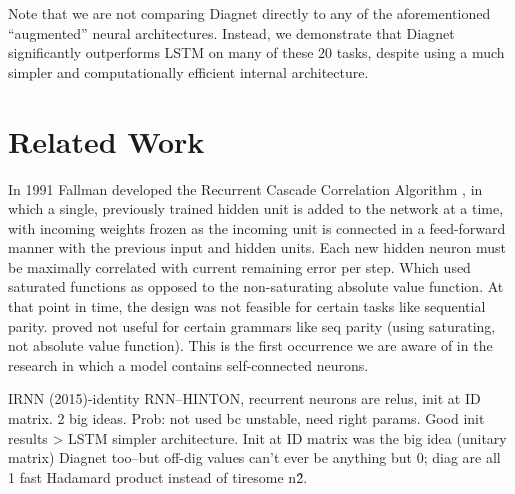 \documentclass{article}
\begin{document}
Note that we are not comparing Diagnet directly to any of the aforementioned “augmented” neural architectures. Instead, we demonstrate that Diagnet significantly outperforms LSTM on many of these 20 tasks, despite using a much simpler and computationally efficient internal architecture.

\section{Related Work}
\label{gen_inst}





In 1991 Fallman developed the Recurrent Cascade Correlation Algorithm \citet{Fahlman1990TheRC}, in which a single, previously trained hidden unit is added to the network at a time, with incoming weights frozen as the incoming unit is connected in a feed-forward manner with the previous input and hidden units. Each new hidden neuron must be maximally correlated with current remaining error per step.  
Which used saturated functions as opposed to the non-saturating absolute value function.  At that point in time, the design was not feasible for certain tasks like sequential parity.  proved not useful for certain grammars like seq parity (using saturating, not absolute value function). This is the first occurrence we are aware of in the research in which a model contains self-connected neurons.

IRNN (2015)-identity RNN--HINTON, recurrent neurons are relus, init at ID matrix. 2 big ideas. Prob: not used bc unstable, need right params.  Good init results > LSTM simpler architecture. Init at ID matrix was the big idea (unitary matrix) Diagnet too--but off-dig values can't ever be anything but 0; diag are all 1 fast Hadamard product instead of tiresome n\^2. 
\end{document}
